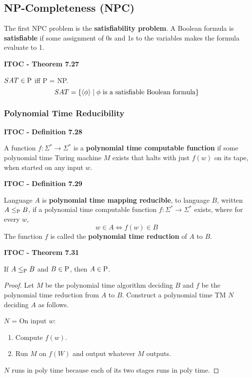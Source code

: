 \subsection{NP-Completeness (NPC)}

The first NPC problem is the \textbf{satisfiability problem}. A Boolean formula is \textbf{satisfiable} if some assignment of 0s and 1s to the variables makes the formula evaluate to 1.

\begin{shaded}
\textbf{ITOC - Theorem 7.27}

\medskip
$SAT \in \P$ iff P = NP.
\[
SAT = \{ \desc{\phi } \mid \text{$\phi$ is a satisfiable Boolean formula}\}
\]
\end{shaded}

\subsubsection{Polynomial Time Reducibility}

\begin{shaded}
\textbf{ITOC - Definition 7.28}

\medskip
A function $f: \Sigma^* \rightarrow \Sigma^*$ is a \textbf{polynomial time computable function} if some polynomial time Turing machine $M$ exists that halts with just $f(w)$ on its tape, when started on any input $w$.
\end{shaded}

\begin{shaded}
\textbf{ITOC - Definition 7.29}

\medskip
Language $A$ is \textbf{polynomial time mapping reducible}, to language $B$, written $A \leq_\P B$, if a polynomial time computable function $f :\Sigma^* \rightarrow \Sigma^*$ exists, where for every $w$,
\[
w\in A \Leftrightarrow f(w) \in B
\]
The function $f$ is called the \textbf{polynomial time reduction} of $A$ to $B$.
\end{shaded}

\begin{shaded}
\textbf{ITOC - Theorem 7.31}

\medskip
If $A \leq_\P B$ and $B \in \P$, then $A \in \P$.
\end{shaded}

\begin{mdframed}
\begin{proof}
Let $M$ be the polynomial time algorithm deciding $B$ and $f$ be the polynomial time reduction from $A$ to $B$. Construct a polynomial time TM $N$ deciding $A$ as follows.

$N$ = On input $w$:
\begin{enumerate}
\item Compute $f(w)$.
\item Run $M$ on $f(W)$ and output whatever $M$ outputs.
\end{enumerate}
$N$ runs in poly time because each of its two stages runs in poly time.
\end{proof}
\end{mdframed}

